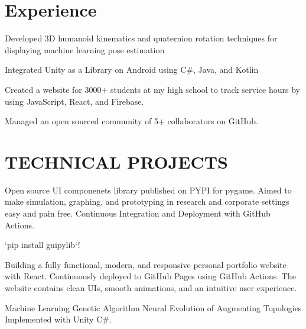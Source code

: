 \documentclass[]{deedy-resume-openfont}
\begin{document}
\begin{minipage}[t]{0.66\textwidth} 


\section{Experience}
\vspace{\topsep} 
\begin{tightemize}
\item Developed 3D humanoid kinematics and quaternion rotation techniques
for displaying machine learning pose estimation
\item Integrated Unity as a Library on Android using C\#, Java, and Kotlin
\end{tightemize}
\sectionsep

\vspace{\topsep} 
\begin{tightemize}
\item Created a website for 3000+ students at my high school to track service hours by using JavaScript, React, and Firebase.
\item Managed an open sourced community of 5+ collaborators on GitHub.
\end{tightemize}
\sectionsep


\section{TECHNICAL PROJECTS}
Open source UI componenets library published on PYPI for pygame. Aimed to make simulation, graphing, and prototyping in research and corporate settings easy and pain free. Continuous Integration and Deployment with GitHub Actions. 

`pip install guipylib`!
\sectionsep

Building a fully functional, modern, and responsive personal portfolio website with React. Continuously deployed to GitHub Pages using GitHub Actions. The website contains clean UIs, smooth animations, and an intuitive user experience.

\sectionsep

Machine Learning Genetic Algorithm Neural Evolution of Augmenting Topologies Implemented with Unity C\#.
\sectionsep

\end{minipage} 
\end{document}
